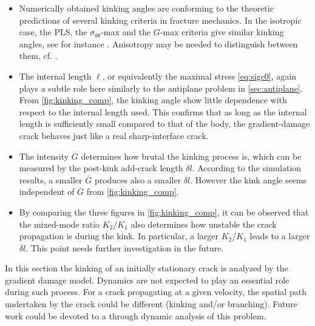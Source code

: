 \begin{itemize}
\item Numerically obtained kinking angles are conforming to the theoretic predictions of several kinking criteria in fracture mechanics. In the isotropic case, the PLS, the $\sigma_{\theta\theta}$-max and the $G$-max criteria give similar kinking angles, see for instance \cite{ChambolleFrancfortMarigo:2009}. Anisotropy may be needed to distinguish between them, cf. \cite{HakimKarma:2005}.

\item The internal length $\ell$, or equivalently the maximal stress \eqref{eq:sigc0}, again plays a subtle role here similarly to the antiplane problem in \cref{sec:antiplane}. From \cref{fig:kinking_comp}, the kinking angle show little dependence with respect to the internal length used. This confirms that as long as the internal length is sufficiently small compared to that of the body, the gradient-damage crack behaves just like a real sharp-interface crack.

\item The intensity $\overline{G}$ determines how brutal the kinking process is, which can be measured by the post-kink add-crack length $\delta l$. According to the simulation results, a smaller $\overline{G}$ produces also a smaller $\delta l$. However the kink angle seems independent of $\overline{G}$ from \cref{fig:kinking_comp}.

\item By comparing the three figures in \eqref{fig:kinking_comp}, it can be observed that the mixed-mode ratio $K_2/K_1$ also determines how unstable the crack propagation is during the kink. In particular, a larger $K_2/K_1$ leads to a larger $\delta l$. This point needs further investigation in the future.
\end{itemize}

In this section the kinking of an initially stationary crack is analyzed by the gradient damage model. Dynamics are not expected to play an essential role during such process. For a crack propagating at a given velocity, the spatial path undertaken by the crack could be different (kinking and/or branching). Future work could be devoted to a through dynamic analysis of this problem.

